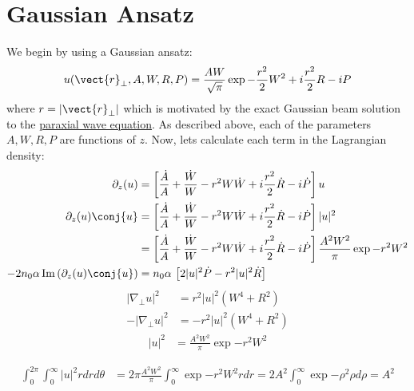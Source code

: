 \section{Gaussian Ansatz}

We begin by using a Gaussian ansatz:
\begin{equation}
    u(\vect{r}_{\perp},A,W,R,P) = \frac{A W}{\sqrt{\pi}} \exp{-\frac{r^2}{2}W^2 + i \frac{r^2}{2}R - i P }
\end{equation}
where $r = |\vect{r}_{\perp}|$ which is motivated by the exact Gaussian beam solution to the \href{https://en.wikipedia.org/wiki/Gaussian_beam}{paraxial wave equation}.   As described above, each of the parameters $A,W,R,P$ are functions of $z$.  Now, lets calculate each term in the Lagrangian density:
\begin{equation}
    \begin{split}
    \partial_{z}(u) &= \left[ \frac{\dot{A}}{A} + \frac{\dot{W}}{W} - r^2 W \dot{W} + i \frac{r^2}{2}\dot{R} - i \dot{P}  \right] u\\
    \partial_{z}(u)\conj{u} &= \left[ \frac{\dot{A}}{A} + \frac{\dot{W}}{W} - r^2 W \dot{W} + i \frac{r^2}{2}\dot{R} - i \dot{P}  \right] |u|^2 \\
    &= \left[ \frac{\dot{A}}{A} + \frac{\dot{W}}{W} - r^2 W \dot{W} + i \frac{r^2}{2}\dot{R} - i \dot{P}  \right] \frac{A^2W^2}{\pi} \exp{-r^2 W^2}\\
    -2 n_0 \alpha\, \mathrm{Im}\left(\partial_{z}(u) \conj{u}\right) &= n_0 \alpha\,\left[2 |u|^2 \dot{P}-r^2 |u|^2 \dot{R} \right]
    \end{split}
\end{equation}
\begin{equation}
    \begin{split}
    |\nabla_{\perp} u|^2 &= r^2 |u|^2\left(W^4 + R^2\right)\\
    -|\nabla_{\perp} u|^2 &= -r^2 |u|^2\left(W^4 + R^2\right)
    \end{split}
\end{equation}
\begin{equation}
    \begin{split}
    |u|^2 &= \frac{A^2W^2}{\pi} \exp{-r^2 W^2}   
    \end{split}
\end{equation}

\begin{equation}
    \begin{split}
    \int_{0}^{2\pi} \int_{0}^{\infty} |u|^2 r dr d\theta &= 2 \pi \frac{A^2W^2}{\pi} \int_{0}^{\infty} \exp{-r^2 W^2}  r dr   = 2 A^2 \int_{0}^{\infty} \exp{-\rho^2}  \rho d\rho =  A^2 
    \end{split}
\end{equation}

